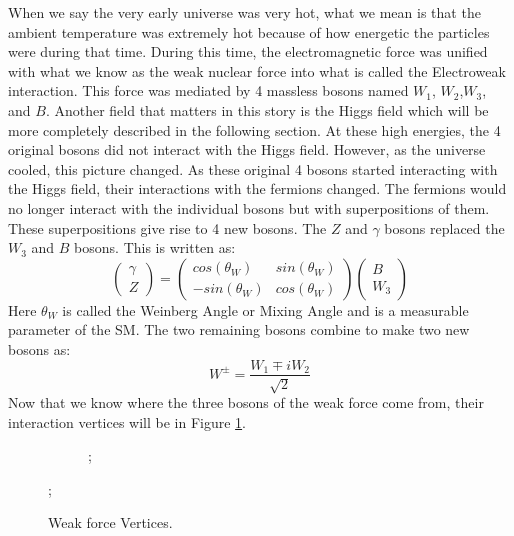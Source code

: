 When we say the very early universe was very hot, what we mean is that the ambient temperature was extremely hot because of how energetic the particles were during that time.
During this time, the electromagnetic force was unified with what we know as the weak nuclear force into what is called the Electroweak interaction. This force was mediated by 4 massless bosons named $W_1$, $W_2$,$W_3$, and $B$. 
Another field that matters in this story is the Higgs field which will be more completely described in the following section. At these high energies, the 4 original bosons did not interact with the Higgs field. However, as the universe cooled, this picture changed.
As these original 4 bosons started interacting with the Higgs field, their interactions with the fermions changed. The fermions would no longer interact with the individual bosons but with superpositions of them. These superpositions give rise to 4 new bosons.
The $Z$ and $\gamma$ bosons replaced the $W_3$ and $B$ bosons. This is written as:
\begin{equation}
   \begin{pmatrix} \gamma \\ Z \end{pmatrix}
   = \begin{pmatrix} cos(\theta_{W}) & sin(\theta_{W}) \\
      -sin(\theta_{W}) & cos(\theta_{W})
   \end{pmatrix}
   \begin{pmatrix} B \\ W_3 \end{pmatrix}
\end{equation}
Here $\theta_{W}$ is called the Weinberg Angle or Mixing Angle and is a measurable parameter of the SM. The two remaining bosons combine to make two new bosons as:
\begin{equation}
   W^{\pm} = \frac{W_1 \mp i W_2}{\sqrt{2}}
\end{equation}
Now that we know where the three bosons of the weak force come from, their interaction vertices will be in Figure \ref{fig:fig_1-7}.
\begin{figure} %
   \centering
   \begin{subfigure}[t]{0.49\textwidth}
      ;
   \end{subfigure}
   ;
   \caption{Weak force Vertices.}
   \label{fig:fig_1-7}
\end{figure}
